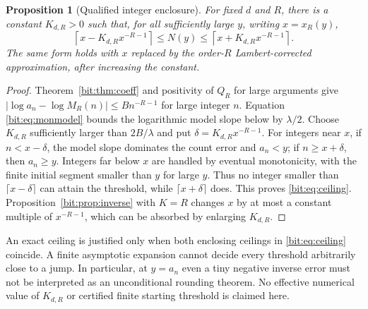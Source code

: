 \documentclass[11pt]{article}
\newtheorem{proposition}[theorem]{Proposition}
\theoremstyle{definition}\newtheorem{definition}[theorem]{Definition}
\theoremstyle{remark}\newtheorem{remark}[theorem]{Remark}
\begin{document}
\begin{proposition}[Qualified integer enclosure]
\label{bit:prop:threshold}
For fixed $d$ and $R$, there is a constant $K_{d,R}>0$ such that, for all sufficiently large $y$, writing $x=x_R(y)$,
\begin{equation}
 \left\lceil x-K_{d,R}x^{-R-1}\right\rceil
 \le N(y)\le
 \left\lceil x+K_{d,R}x^{-R-1}\right\rceil.
 \label{bit:eq:ceiling}
\end{equation}
The same form holds with $x$ replaced by the order-$R$ Lambert-corrected approximation, after increasing the constant.
\end{proposition}
\begin{proof}
Theorem~\ref{bit:thm:coeff} and positivity of $Q_R$ for large arguments give
$|\log a_n-\log M_R(n)|\le Bn^{-R-1}$ for large integer $n$. Equation \eqref{bit:eq:monmodel} bounds the logarithmic model slope below by $\lambda/2$. Choose $K_{d,R}$ sufficiently larger than $2B/\lambda$ and put $\delta=K_{d,R}x^{-R-1}$.
For integers near $x$, if $n<x-\delta$, the model slope dominates the count error and $a_n<y$; if $n\ge x+\delta$, then $a_n\ge y$. Integers far below $x$ are handled by eventual monotonicity, with the finite initial segment smaller than $y$ for large $y$. Thus no integer smaller than $\lceil x-\delta\rceil$ can attain the threshold, while $\lceil x+\delta\rceil$ does. This proves \eqref{bit:eq:ceiling}. Proposition~\ref{bit:prop:inverse} with $K=R$ changes $x$ by at most a constant multiple of $x^{-R-1}$, which can be absorbed by enlarging $K_{d,R}$.
\end{proof}

An exact ceiling is justified only when both enclosing ceilings in \eqref{bit:eq:ceiling} coincide. A finite asymptotic expansion cannot decide every threshold arbitrarily close to a jump. In particular, at $y=a_n$ even a tiny negative inverse error must not be interpreted as an unconditional rounding theorem. No effective numerical value of $K_{d,R}$ or certified finite starting threshold is claimed here.
\end{document}
